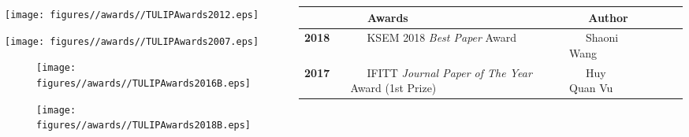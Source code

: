 \documentclass{tikzposter} %
\begin{document}
\begin{columns}
{			\vspace{0.6cm}
						
			\begin{minipage}{\linewidth}
				\begin{multicols}{3}
				\centering
				\begin{minipage}{\linewidth}
					\centering
					\texttt{[image: figures//awards//TULIPAwards2012.eps]}
				\end{minipage}
				
				\begin{minipage}{\linewidth}
					\texttt{[image: figures//awards//TULIPAwards2007.eps]}
				\end{minipage}				
				
				\begin{minipage}{\linewidth}
				\begin{figure}[H]
					\begin{minipage}{\linewidth}
					\subfigure
					{
						\texttt{[image: figures//awards//TULIPAwards2016B.eps]}
					}
					\end{minipage}
				
					\begin{minipage}{\linewidth}
					\subfigure
					{
						\texttt{[image: figures//awards//TULIPAwards2018B.eps]}
					}
					\end{minipage}
				\end{figure}	
				\end{minipage}	
				\end{multicols}
			\end{minipage}
			
			\vspace{1.3cm}
			
			\scalebox{1}
			{
				\begin{minipage}{\linewidth}
					 \centering
					\small
					\begin{tabular}{ >{\centering}p{0.12\linewidth}  | p{0.58\linewidth} | p{0.2\linewidth}   r }
						\toprule
						\multicolumn{1}{ c |}{\textbf{Year}} & \textbf{~~ Awards} & \textbf{~~~Author} &  \\
						\midrule
						\textbf{2018} & ~~~KSEM 2018 \textit{Best Paper} Award & ~~~Shaoni Wang &  \\
						
						\textbf{2017} & ~~~IFITT \textit{Journal Paper of The Year} Award (1st Prize) & ~~~Huy Quan Vu &  \\
						

\end{tabular}
\end{minipage}}}
\end{columns}
\end{document}
